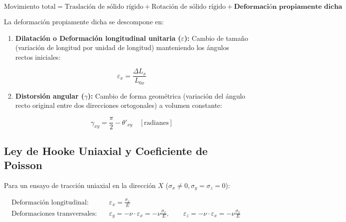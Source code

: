 \begin{equation}

    \text{Movimiento total} = \text{Traslación de sólido rígido} + \text{Rotación de sólido rígido} + \textbf{Deformación propiamente dicha}

\end{equation}

La deformación propiamente dicha se descompone en:

\begin{enumerate}

    \item \textbf{Dilatación o Deformación longitudinal unitaria ($\varepsilon$):} Cambio de tamaño (variación de longitud por unidad de longitud) manteniendo los ángulos rectos iniciales:

          \begin{equation}

              \varepsilon_x = \frac{\Delta L_x}{L_{0x}}

          \end{equation}

    \item \textbf{Distorsión angular ($\gamma$):} Cambio de forma geométrica (variación del ángulo recto original entre dos direcciones ortogonales) a volumen constante:

          \begin{equation}

              \gamma_{xy} = \frac{\pi}{2} - \theta'_{xy} \quad [\text{radianes}]

          \end{equation}

\end{enumerate}



\subsection{Ley de Hooke Uniaxial y Coeficiente de Poisson}

Para un ensayo de tracción uniaxial en la dirección $X$ ($\sigma_x \neq 0, \sigma_y = \sigma_z = 0$):

\begin{align}

    \text{Deformación longitudinal:}    & \quad \varepsilon_x = \frac{\sigma_x}{E}                                                                                                            \\

    \text{Deformaciones transversales:} & \quad \varepsilon_y = -\nu \cdot \varepsilon_x = -\nu \frac{\sigma_x}{E}, \qquad \varepsilon_z = -\nu \cdot \varepsilon_x = -\nu \frac{\sigma_x}{E}

\end{align}

